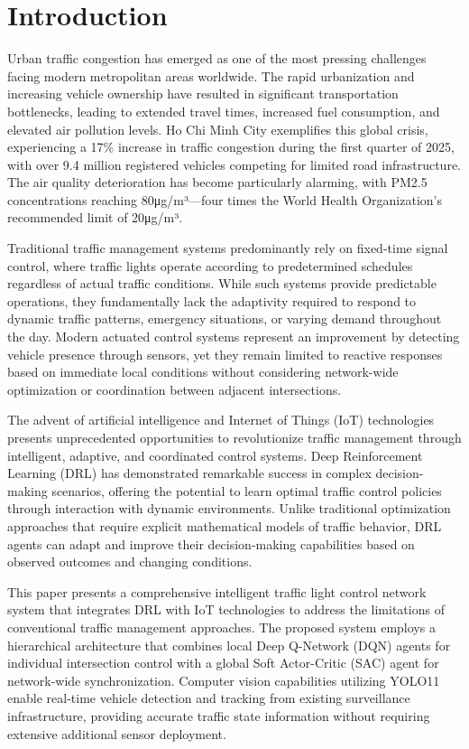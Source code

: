\section{Introduction}\label{sec1}

Urban traffic congestion has emerged as one of the most pressing challenges facing modern metropolitan areas worldwide. The rapid urbanization and increasing vehicle ownership have resulted in significant transportation bottlenecks, leading to extended travel times, increased fuel consumption, and elevated air pollution levels. Ho Chi Minh City exemplifies this global crisis, experiencing a 17\% increase in traffic congestion during the first quarter of 2025, with over 9.4 million registered vehicles competing for limited road infrastructure. The air quality deterioration has become particularly alarming, with PM2.5 concentrations reaching 80μg/m³—four times the World Health Organization's recommended limit of 20μg/m³.

Traditional traffic management systems predominantly rely on fixed-time signal control, where traffic lights operate according to predetermined schedules regardless of actual traffic conditions. While such systems provide predictable operations, they fundamentally lack the adaptivity required to respond to dynamic traffic patterns, emergency situations, or varying demand throughout the day. Modern actuated control systems represent an improvement by detecting vehicle presence through sensors, yet they remain limited to reactive responses based on immediate local conditions without considering network-wide optimization or coordination between adjacent intersections.

The advent of artificial intelligence and Internet of Things (IoT) technologies presents unprecedented opportunities to revolutionize traffic management through intelligent, adaptive, and coordinated control systems. Deep Reinforcement Learning (DRL) has demonstrated remarkable success in complex decision-making scenarios, offering the potential to learn optimal traffic control policies through interaction with dynamic environments. Unlike traditional optimization approaches that require explicit mathematical models of traffic behavior, DRL agents can adapt and improve their decision-making capabilities based on observed outcomes and changing conditions.

This paper presents a comprehensive intelligent traffic light control network system that integrates DRL with IoT technologies to address the limitations of conventional traffic management approaches. The proposed system employs a hierarchical architecture that combines local Deep Q-Network (DQN) agents for individual intersection control with a global Soft Actor-Critic (SAC) agent for network-wide synchronization. Computer vision capabilities utilizing YOLO11 enable real-time vehicle detection and tracking from existing surveillance infrastructure, providing accurate traffic state information without requiring extensive additional sensor deployment.

